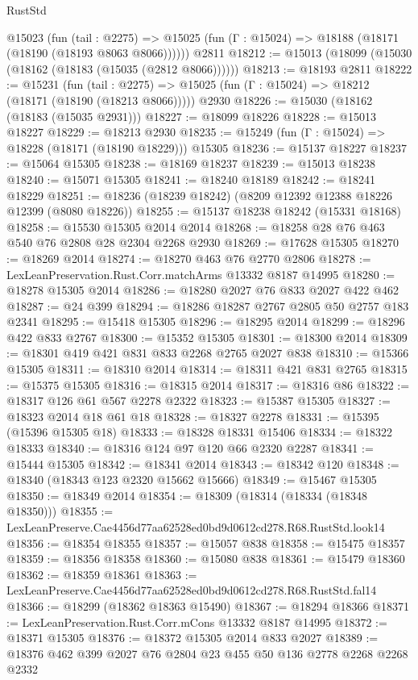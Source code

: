 \begin{lexlean}{RustStd}
\begin{coremodule}
    @15023
      (fun (tail : @2275) =>
      @15025 (fun (Γ : @15024) => @18188 (@18171 (@18190 (@18193 @8063 @8066))))))
    @2811
@18212 := @15013 (@18099 (@15030 (@18162 (@18183 (@15035 (@2812 @8066))))))
@18213 := @18193 @2811
@18222 := @15231
    (fun (tail : @2275) => @15025 (fun (Γ : @15024) => @18212 (@18171 (@18190 (@18213 @8066)))))
    @2930
@18226 := @15030 (@18162 (@18183 (@15035 @2931)))
@18227 := @18099 @18226
@18228 := @15013 @18227
@18229 := @18213 @2930
@18235 := @15249 (fun (Γ : @15024) => @18228 (@18171 (@18190 @18229))) @15305
@18236 := @15137 @18227
@18237 := @15064 @15305
@18238 := @18169 @18237
@18239 := @15013 @18238
@18240 := @15071 @15305
@18241 := @18240 @18189
@18242 := @18241 @18229
@18251 := @18236 (@18239 @18242) (@8209 @12392 @12388 @18226 @12399 (@8080 @18226))
@18255 := @15137 @18238 @18242 (@15331 @18168)
@18258 := @15530 @15305 @2014 @2014
@18268 := @18258 @28 @76 @463 @540 @76 @2808 @28 @2304 @2268 @2930
@18269 := @17628 @15305
@18270 := @18269 @2014
@18274 := @18270 @463 @76 @2770 @2806
@18278 := LexLeanPreservation.Rust.Corr.matchArms @13332 @8187 @14995
@18280 := @18278 @15305 @2014
@18286 := @18280 @2027 @76 @833 @2027 @422 @462
@18287 := @24 @399
@18294 := @18286 @18287 @2767 @2805 @50 @2757 @183 @2341
@18295 := @15418 @15305
@18296 := @18295 @2014
@18299 := @18296 @422 @833 @2767
@18300 := @15352 @15305
@18301 := @18300 @2014
@18309 := @18301 @419 @421 @831 @833 @2268 @2765 @2027 @838
@18310 := @15366 @15305
@18311 := @18310 @2014
@18314 := @18311 @421 @831 @2765
@18315 := @15375 @15305
@18316 := @18315 @2014
@18317 := @18316 @86
@18322 := @18317 @126 @61 @567 @2278 @2322
@18323 := @15387 @15305
@18327 := @18323 @2014 @18 @61 @18
@18328 := @18327 @2278
@18331 := @15395 (@15396 @15305 @18)
@18333 := @18328 @18331 @15406
@18334 := @18322 @18333
@18340 := @18316 @124 @97 @120 @66 @2320 @2287
@18341 := @15444 @15305
@18342 := @18341 @2014
@18343 := @18342 @120
@18348 := @18340 (@18343 @123 @2320 @15662 @15666)
@18349 := @15467 @15305
@18350 := @18349 @2014
@18354 := @18309 (@18314 (@18334 (@18348 @18350)))
@18355 := LexLeanPreserve.Cae4456d77aa62528ed0bd9d0612cd278.R68.RustStd.look14
@18356 := @18354 @18355
@18357 := @15057 @838
@18358 := @15475 @18357
@18359 := @18356 @18358
@18360 := @15080 @838
@18361 := @15479 @18360
@18362 := @18359 @18361
@18363 := LexLeanPreserve.Cae4456d77aa62528ed0bd9d0612cd278.R68.RustStd.fal14
@18366 := @18299 (@18362 @18363 @15490)
@18367 := @18294 @18366
@18371 := LexLeanPreservation.Rust.Corr.mCons @13332 @8187 @14995
@18372 := @18371 @15305
@18376 := @18372 @15305 @2014 @833 @2027
@18389 := @18376 @462 @399 @2027 @76 @2804 @23 @455 @50 @136 @2778 @2268 @2268 @2332

\end{coremodule}
\end{lexlean}
